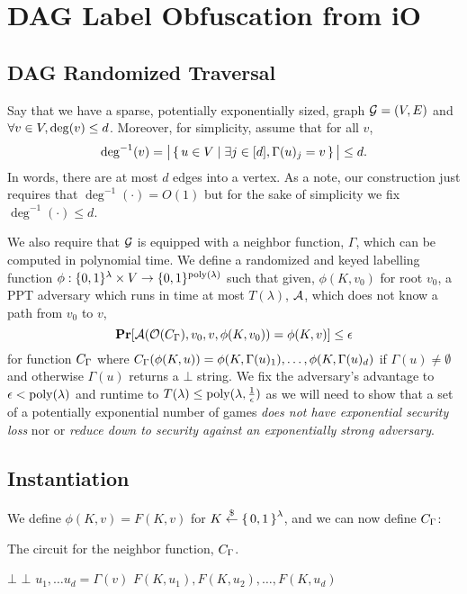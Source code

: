 \newcommand{\labelFunc}{\phi}
\newcommand{\imageFn}{\text{Image}}
\newcommand{\pathSuffix}{\text{Suff}}
\newcommand{\pathSet}{\mathcal{P}}
\newcommand{\obfFN}{\mathcal{O}}
\newcommand{\circMid}{C^{\text{Mid}}}

\section{DAG Label Obfuscation from iO}
\subsection{DAG Randomized Traversal}
Say that we have a sparse, potentially exponentially sized, graph $\mathcal{G} = (V, E)$
and $\forall v \in V, \deg(v) \leq d$. Moreover, for simplicity,
assume that for all $v$, 
$$
\deg^{-1}(v) = \big|\set{u \in V \mid \exists j \in [d], \Gamma(u)_j = v}\big| \leq d.
$$
In words, there are at most $d$ edges into a vertex. As a note, our construction just requires
that $\deg^{-1}(\cdot) = O(1)$ but for the sake of simplicity we fix $\deg^{-1}(\cdot) \leq d$.

We also require that $\mathcal{G}$ is equipped with a neighbor function, $\Gamma$, which can be computed in polynomial time.
We define a randomized and keyed labelling function $\phi: \{0,1\}^\lambda \times V \rightarrow \{0,1\}^{\operatorname{poly}(\lambda)}$ 
such that given, $\phi(K, v_0)$ for root $v_0$, a PPT adversary which runs in time at most $T(\lambda)$, $\mathcal{A}$, which does not know a path from $v_0$ to $v$,
\begin{equation}
	\label{eq:guessPhi}
	\Pr[\advers(\mathcal{O}(\circNeigb), v_0, v, \labelFunc(K, v_0)) = \labelFunc(K, v)] \leq \epsilon
\end{equation}
for function $C_\Gamma$ where $\circNeigb(\labelFunc(K, u)) = \labelFunc(K, \Gamma(u)_1), \dots, \labelFunc(K, \Gamma(u)_d)$
if $\Gamma(u) \neq \emptyset$ and otherwise $\Gamma(u)$ returns a $\bot$ string.
We fix the adversary's advantage to $\epsilon < \operatorname{poly}(\lambda)$ and runtime to $T(\lambda) \leq \operatorname{poly}(\lambda, \frac{1}{\epsilon})$
as we will need to show
that a set of a potentially exponential number of games \emph{does not have exponential security loss}
nor or \emph{reduce down to security against an exponentially strong adversary}.

\subsection{Instantiation}
We define 
$
	\labelFunc(K, v) = F(K, v)
$ for $K \overset{\$}{\gets} \set{0, 1}^\lambda$, and we can now define $C_\Gamma$:
\begin{algorithm}[H]
	\caption{
		The circuit for the neighbor function, $C_\Gamma$.
	}
	\begin{algorithmic}[1]
				\State \Return $\bot$
			\EndIf
				\State \Return $\bot$
			\EndIf
			\State $u_1, \dots u_d = \Gamma(v)$
			\State \Return $F(K, u_1), F(K, u_2), \dots, F(K, u_d)$
		\EndFunction
	\end{algorithmic}
	\label{alg:neighb}
\end{algorithm}

